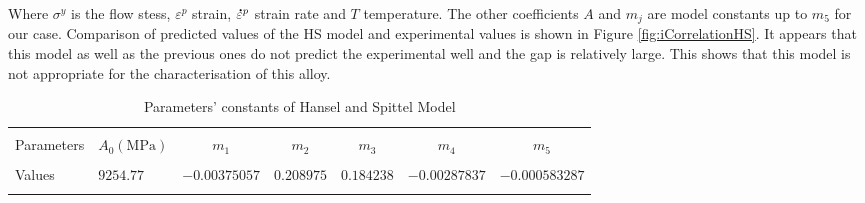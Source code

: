 \documentclass[twoside,english,1p,final,sort&compress]{elsarticle}
\theoremstyle{plain}
\newcommand{\mdot}[1]{\accentset{\mbox{\bfseries .}}{#1}}
\begin{document}
Where $\sigma^y$ is the flow stess, $\varepsilon^p$ strain, $\mdot\varepsilon^p$ strain rate and $T$ temperature. The other coefficients $A$ and $m_j$ are model constants up to $m_5$ for our case. Comparison of predicted values of the HS model and experimental values is shown in Figure \ref{fig:iCorrelationHS}. It appears that this model as well as the previous ones do not predict the experimental well and the gap is relatively large. This shows that this model is not appropriate for the characterisation of this alloy.
\begin{table}[h!]
\centering{}
\caption{Parameters' constants of Hansel and Spittel Model}
\begin{tabular}{llccccc}
\hline
&         &             &		   &		 &			   &\\
Parameters&$A_0(\text{MPa})$    &$m_1$        & $m_2$     & $m_3$   & $m_4$       &$m_5$\\
&         &             &		   &	     &	           &\\
\hline
Values&$9254.77$&$-0.00375057$& $0.208975$&$0.184238$&$-0.00287837$&$-0.000583287$\\
\hline
\label{tab: HSparameters}
\end{tabular}
\end{table}
\end{document}
